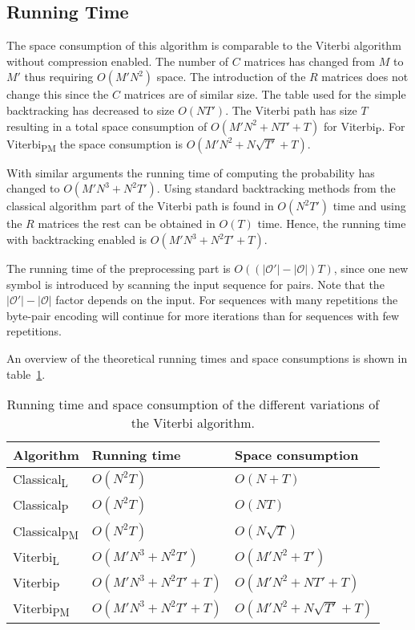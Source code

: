 \subsection{Running Time}
\label{sec:running-time}

The space consumption of this algorithm is comparable to the Viterbi algorithm
without compression enabled. The number of $C$ matrices has changed from $M$ to
$M'$ thus requiring $O(M' N^2)$ space. The introduction of the $R$ matrices
does not change this since the $C$ matrices are of similar size. The table used
for the simple backtracking has decreased to size $O(N T')$. The Viterbi path
has size $T$ resulting in a total space consumption of $O(M' N^2 + N T' + T)$
for Viterbi\textsubscript{P}. For Viterbi\textsubscript{PM} the space
consumption is $O(M' N^2 + N \sqrt{T'} + T)$.

With similar arguments the running time of computing the probability has changed
to $O(M' N^3 +N^2 T')$. Using standard backtracking methods from the classical
algorithm part of the Viterbi path is found in $O(N^2 T')$ time and using the
$R$ matrices the rest can be obtained in $O(T)$ time. Hence, the
running time with backtracking enabled is $O(M' N^3 +N^2 T' + T)$.

The running time of the preprocessing part is $O(
(
  \lvert\mathcal{O'}\rvert - \lvert{\mathcal{O}}\rvert
) T)$, since one new symbol is introduced by scanning the input sequence for
pairs. Note that the $\lvert\mathcal{O'}\rvert - \lvert{\mathcal{O}}\rvert$
factor depends on the input. For sequences with many repetitions the byte-pair
encoding will continue for more iterations than for sequences with few
repetitions.

An overview of the theoretical running times and space consumptions is shown in
table~\ref{tab:running-time}.

\begin{table}
  \centering
  \caption{Running time and space consumption of the different variations of the
    Viterbi algorithm.}
  \label{tab:running-time}
  \begin{tabular}{lll}
    \toprule
    Algorithm                   & Running time             & Space consumption             \\
    \midrule
    Classical\textsubscript{L}  & $O(N^2 T)$               & $O(N + T)$                    \\
    Classical\textsubscript{P}  & $O(N^2 T)$               & $O(NT)$                       \\
    Classical\textsubscript{PM} & $O(N^2 T)$               & $O(N\sqrt{T})$                \\
    Viterbi\textsubscript{L}    & $O(M' N^3 + N^2 T')$     & $O(M' N^2 + T')$              \\
    Viterbi\textsubscript{P}    & $O(M' N^3 + N^2 T' + T)$ & $O(M' N^2 + N T' + T)$        \\
    Viterbi\textsubscript{PM}   & $O(M' N^3 + N^2 T' + T)$ & $O(M' N^2 + N \sqrt{T'} + T)$ \\
    \bottomrule
  \end{tabular}
\end{table}

